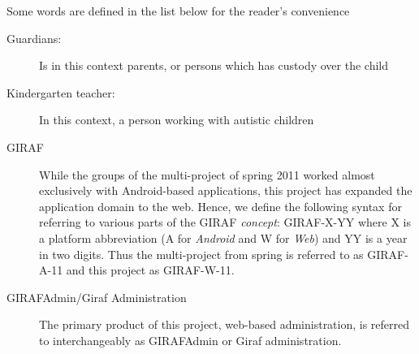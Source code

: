 Some words are defined in the list below for the reader's convenience
\begin{description}
\item[Guardians:] Is in this context parents, or persons which has custody over the child
\item[Kindergarten teacher:] In this context, a person working with autistic children
\item[GIRAF] While the groups of the multi-project of spring 2011 worked almost exclusively with Android-based applications, this project has expanded the application domain to the web. Hence, we define the following syntax for referring to various parts of the GIRAF \emph{concept}: GIRAF-X-YY where X is a platform abbreviation (A for \emph{Android} and W for \emph{Web}) and YY is a year in two digits. Thus the multi-project from spring is referred to as GIRAF-A-11 and this project as GIRAF-W-11.
\item[GIRAFAdmin/Giraf Administration] The primary product of this project, web-based administration, is referred to interchangeably as GIRAFAdmin or Giraf administration.
\end{description}